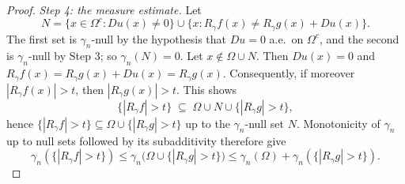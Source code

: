 \begin{proof}
\emph{Step 4: the measure estimate.}
Let
\[
  N = \{x \in \Omega^c : Du(x) \neq 0\} \cup
      \{x : R_\gamma f(x) \neq R_\gamma g(x) + Du(x)\} .
\]
The first set is $\gamma_n$-null by the hypothesis that $Du = 0$ a.e.\ on
$\Omega^c$, and the second is $\gamma_n$-null by Step 3; so $\gamma_n(N) = 0$.
Let $x \notin \Omega \cup N$.  Then $Du(x) = 0$ and
$R_\gamma f(x) = R_\gamma g(x) + Du(x) = R_\gamma g(x)$.  Consequently, if
moreover $|R_\gamma f(x)| > t$, then $|R_\gamma g(x)| > t$.  This shows
\[
  \{|R_\gamma f|>t\} \;\subseteq\; \Omega \cup N \cup \{|R_\gamma g|>t\} ,
\]
hence $\{|R_\gamma f|>t\} \subseteq \Omega \cup \{|R_\gamma g|>t\}$ up to the
$\gamma_n$-null set $N$.  Monotonicity of $\gamma_n$ up to null sets followed by
its subadditivity therefore give
\[
  \gamma_n(\{|R_\gamma f|>t\})
    \leq \gamma_n\bigl(\Omega \cup \{|R_\gamma g|>t\}\bigr)
    \leq \gamma_n(\Omega) + \gamma_n(\{|R_\gamma g|>t\}) .
\]
\end{proof}
